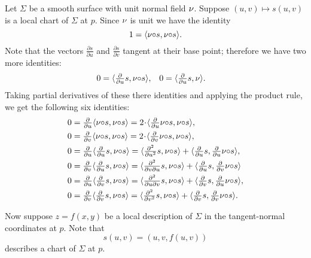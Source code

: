 Let $\Sigma$ be a smooth surface with unit normal field $\nu$.
Suppose $(u,v)\mapsto s(u,v)$ is a local chart of $\Sigma$ at $p$.
Since $\nu$ is unit we have the identity
\[1=\langle\nu{\circ} s,\nu{\circ} s\rangle.\]
Note that the vectors $\tfrac{\partial s}{\partial u}$ and $\tfrac{\partial s}{\partial v}$ tangent at their base point; therefore we have two more identities:
\begin{align*}
 0&=\langle\tfrac{\partial}{\partial u} s,\nu{\circ} s\rangle,
 &
 0&=\langle\tfrac{\partial}{\partial u} s,\nu\rangle.
\end{align*}
Taking partial derivatives of these there identities and applying the product rule,
we get the following six identities:
\begin{align*}
0&=\tfrac{\partial}{\partial u}\langle\Norm{\circ} s,\Norm{\circ} s\rangle
=
2\cdot \langle\tfrac{\partial}{\partial u}\Norm{\circ} s,\Norm{\circ} s\rangle,
\\
0&=\tfrac{\partial}{\partial v}\langle\Norm{\circ} s,\Norm{\circ} s\rangle=2\cdot \langle\tfrac{\partial}{\partial v}\Norm{\circ} s,\Norm{\circ} s\rangle,
\\
0&=\tfrac{\partial}{\partial u}\langle\tfrac{\partial}{\partial u} s,\Norm{\circ} s\rangle=\langle\tfrac{\partial^2}{\partial u^2} s,\Norm{\circ} s\rangle+\langle\tfrac{\partial}{\partial u} s,\tfrac{\partial}{\partial u}\Norm{\circ} s\rangle,
\\
0&=\tfrac{\partial}{\partial v}\langle\tfrac{\partial}{\partial u} s,\Norm{\circ} s\rangle=\langle\tfrac{\partial^2}{\partial v\partial u} s,\Norm{\circ} s\rangle+\langle\tfrac{\partial}{\partial u} s,\tfrac{\partial}{\partial v}\Norm{\circ} s\rangle
\\
0&=\tfrac{\partial}{\partial u}\langle\tfrac{\partial}{\partial v} s,\Norm{\circ} s\rangle=\langle\tfrac{\partial^2}{\partial u\partial v} s,\Norm{\circ} s\rangle+\langle\tfrac{\partial}{\partial v} s,\tfrac{\partial}{\partial u}\Norm{\circ} s\rangle,
\\
0&=\tfrac{\partial}{\partial v}\langle\tfrac{\partial}{\partial v} s,\Norm{\circ} s\rangle=\langle\tfrac{\partial^2}{\partial v^2} s,\Norm{\circ} s\rangle
+
\langle\tfrac{\partial}{\partial v} s,\tfrac{\partial}{\partial v}\Norm{\circ} s\rangle.
\end{align*}

Now suppose $z=f(x,y)$ be a local description of $\Sigma$ in the tangent-normal coordinates at $p$.
Note that 
\[s(u,v)=(u,v,f(u,v))\]
describes a chart of $\Sigma$ at $p$.

